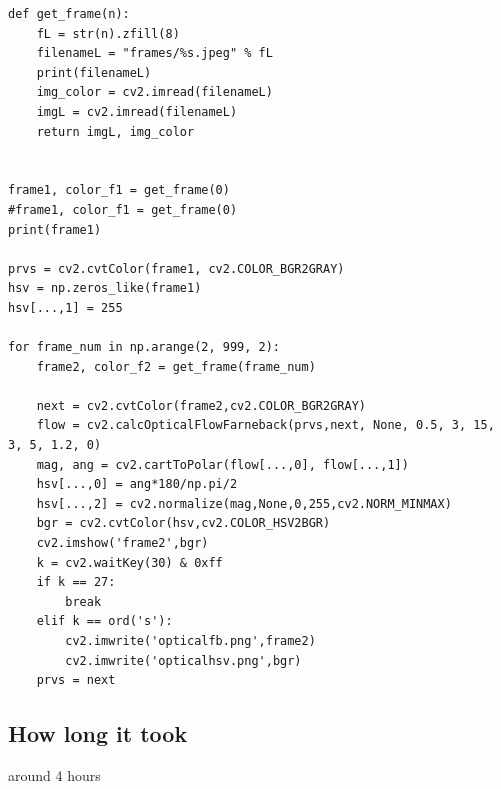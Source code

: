 \documentclass{article}
\begin{document}
\begin{verbatim}
def get_frame(n):
    fL = str(n).zfill(8)
    filenameL = "frames/%s.jpeg" % fL
    print(filenameL)
    img_color = cv2.imread(filenameL)
    imgL = cv2.imread(filenameL)
    return imgL, img_color


frame1, color_f1 = get_frame(0)
#frame1, color_f1 = get_frame(0)
print(frame1)

prvs = cv2.cvtColor(frame1, cv2.COLOR_BGR2GRAY)
hsv = np.zeros_like(frame1)
hsv[...,1] = 255

for frame_num in np.arange(2, 999, 2):
    frame2, color_f2 = get_frame(frame_num)

    next = cv2.cvtColor(frame2,cv2.COLOR_BGR2GRAY)
    flow = cv2.calcOpticalFlowFarneback(prvs,next, None, 0.5, 3, 15, 3, 5, 1.2, 0)
    mag, ang = cv2.cartToPolar(flow[...,0], flow[...,1])
    hsv[...,0] = ang*180/np.pi/2
    hsv[...,2] = cv2.normalize(mag,None,0,255,cv2.NORM_MINMAX)
    bgr = cv2.cvtColor(hsv,cv2.COLOR_HSV2BGR)
    cv2.imshow('frame2',bgr)
    k = cv2.waitKey(30) & 0xff
    if k == 27:
        break
    elif k == ord('s'):
        cv2.imwrite('opticalfb.png',frame2)
        cv2.imwrite('opticalhsv.png',bgr)
    prvs = next

\end{verbatim}

\subsection{How long it took}
around 4 hours
\end{document}
